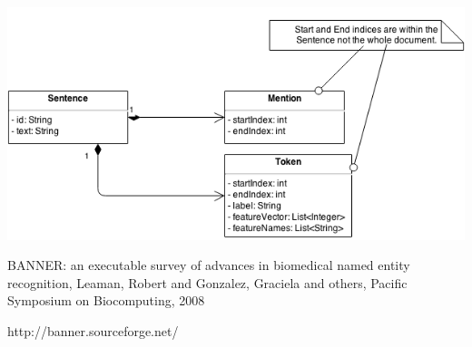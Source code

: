 \documentclass{article}
\begin{document}
\includegraphics[width=14cm]{HW1-genes-UML.png}


\begin{thebibliography}{9}


BANNER: an executable survey of advances in biomedical named entity recognition,
Leaman, Robert and Gonzalez, Graciela and others,
  Pacific Symposium on Biocomputing,
  2008

  http://banner.sourceforge.net/

\end{thebibliography}
\end{document}

